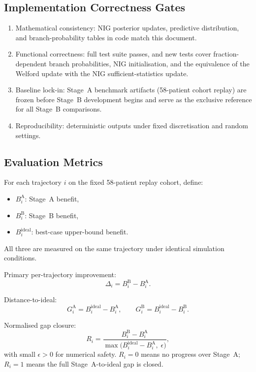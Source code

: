 \documentclass[11pt]{article}
\begin{document}
\subsection{Implementation Correctness Gates}
\begin{enumerate}
\item Mathematical consistency: NIG posterior updates, predictive distribution, and branch-probability tables in code match this document.
\item Functional correctness: full test suite passes, and new tests cover fraction-dependent branch probabilities, NIG initialisation, and the equivalence of the Welford update with the NIG sufficient-statistics update.
\item Baseline lock-in: Stage~A benchmark artifacts (58-patient cohort replay) are frozen before Stage~B development begins and serve as the exclusive reference for all Stage~B comparisons.
\item Reproducibility: deterministic outputs under fixed discretisation and random settings.
\end{enumerate}

\subsection{Evaluation Metrics}

For each trajectory $i$ on the fixed 58-patient replay cohort, define:
\begin{itemize}
\item $B_i^{\mathrm{A}}$: Stage~A benefit,
\item $B_i^{\mathrm{B}}$: Stage~B benefit,
\item $B_i^{\mathrm{ideal}}$: best-case upper-bound benefit.
\end{itemize}
All three are measured on the same trajectory under identical simulation conditions.

Primary per-trajectory improvement:
\begin{equation}
\Delta_i = B_i^{\mathrm{B}} - B_i^{\mathrm{A}}.
\end{equation}

Distance-to-ideal:
\begin{equation}
G_i^{\mathrm{A}} = B_i^{\mathrm{ideal}} - B_i^{\mathrm{A}},\qquad
G_i^{\mathrm{B}} = B_i^{\mathrm{ideal}} - B_i^{\mathrm{B}}.
\end{equation}

Normalised gap closure:
\begin{equation}
R_i = \frac{B_i^{\mathrm{B}} - B_i^{\mathrm{A}}}{\max\!\bigl(B_i^{\mathrm{ideal}} - B_i^{\mathrm{A}},\;\epsilon\bigr)},
\end{equation}
with small $\epsilon > 0$ for numerical safety. $R_i = 0$ means no progress over Stage~A; $R_i = 1$ means the full Stage~A-to-ideal gap is closed.
\end{document}
